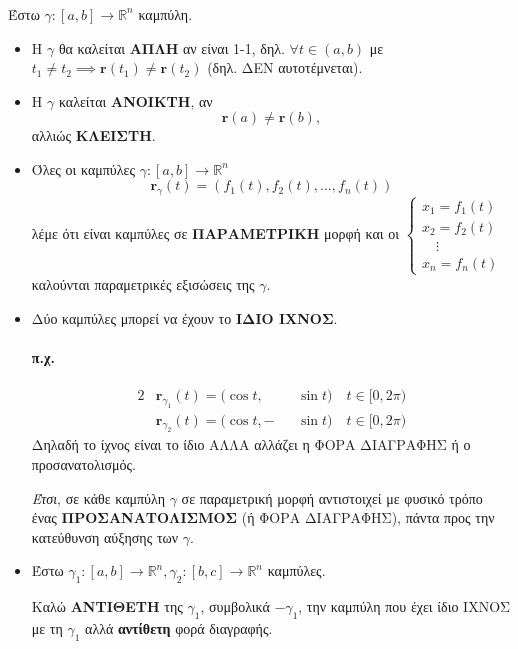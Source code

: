 \documentclass[11pt,a4paper,titlepage,draft]{article}
\begin{document}
\subsubsection*{}

Έστω \( \gamma: [a,b] \rightarrow \mathbb R ^ n \) καμπύλη.
\begin{itemize}
\item Η \(\gamma\) θα καλείται \textbf{ΑΠΛΗ} αν είναι 1-1, δηλ. \( \forall t \in (a,b) \) με \(t_1 \neq t_2 \implies \mathbf r(t_1) \neq \mathbf r(t_2)\) (δηλ. ΔΕΝ αυτοτέμνεται).

\item Η \(\gamma\) καλείται \textbf{ΑΝΟΙΚΤΗ}, αν \[\mathbf r(a) \neq \mathbf r(b),\] αλλιώς \textbf{ΚΛΕΙΣΤΗ}.

\item Όλες οι καμπύλες \(\gamma: [a,b] \rightarrow \mathbb R ^ n\) \[\mathbf r_\gamma(t) = \left( f_1(t),f_2(t),\dots,f_n(t) \right)\] λέμε ότι είναι καμπύλες σε \textbf{ΠΑΡΑΜΕΤΡΙΚΗ} μορφή και οι
\(
\begin{cases}
x_1 = f_1(t) \\
x_2 = f_2(t) \\
\quad \vdots \\
x_n = f_n(t)
\end{cases}
\) καλούνται παραμετρικές εξισώσεις της \(\gamma\).

\item Δύο καμπύλες μπορεί να έχουν το \textbf{ΙΔΙΟ ΙΧΝΟΣ}.
\paragraph{π.χ.}
\begin{alignat*}{2}
&\mathbf r_{\gamma_1}(t) = ( \cos t,  && \sin t )  \quad t \in [0, 2 \pi ) \\
&\mathbf r_{\gamma_2}(t) = ( \cos t, - && \sin t )  \quad t \in [0, 2 \pi )
\end{alignat*}
Δηλαδή το ίχνος είναι το ίδιο ΑΛΛΑ αλλάζει η ΦΟΡΑ ΔΙΑΓΡΑΦΗΣ ή ο προσανατολισμός.

\emph{Έτσι}, σε κάθε καμπύλη \(\gamma\) σε παραμετρική μορφή αντιστοιχεί με φυσικό τρόπο ένας \textbf{ΠΡΟΣΑΝΑΤΟΛΙΣΜΟΣ} (ή ΦΟΡΑ ΔΙΑΓΡΑΦΗΣ), πάντα προς την κατεύθυνση αύξησης των \(\gamma\).

\item Έστω \(\gamma_1: [a,b] \rightarrow \mathbb R^n, \gamma_2: [b,c] \rightarrow \mathbb R^n\) καμπύλες.

Καλώ \textbf{ΑΝΤΙΘΕΤΗ} της \(\gamma_1\), συμβολικά \(- \gamma_1\), την καμπύλη που έχει ίδιο ΙΧΝΟΣ με τη \(\gamma_1\) αλλά \textbf{αντίθετη} φορά διαγραφής.


\end{itemize}
\end{document}
